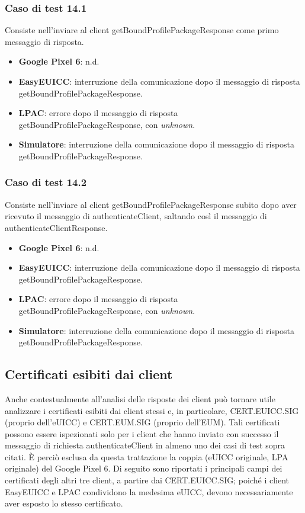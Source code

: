 \documentclass[10pt, oneside]{book}
\begin{document}
\subsubsection{Caso di test 14.1}
Consiste nell’inviare al client getBoundProfilePackageResponse come primo messaggio di risposta.
\begin{itemize}
\item \textbf{Google Pixel 6}: n.d.
\item \textbf{EasyEUICC}: interruzione della comunicazione dopo il messaggio di risposta getBoundProfilePackageResponse.
\item \textbf{LPAC}: errore dopo il messaggio di risposta getBoundProfilePackageResponse, con \textit{unknown}.
\item \textbf{Simulatore}: interruzione della comunicazione dopo il messaggio di risposta getBoundProfilePackageResponse.
\end{itemize}

\subsubsection{Caso di test 14.2}
Consiste nell’inviare al client getBoundProfilePackageResponse subito dopo aver ricevuto il messaggio di authenticateClient, saltando così il messaggio di authenticateClientResponse.
\begin{itemize}
\item \textbf{Google Pixel 6}: n.d.
\item \textbf{EasyEUICC}: interruzione della comunicazione dopo il messaggio di risposta getBoundProfilePackageResponse.
\item \textbf{LPAC}: errore dopo il messaggio di risposta getBoundProfilePackageResponse, con \textit{unknown}.
\item \textbf{Simulatore}: interruzione della comunicazione dopo il messaggio di risposta getBoundProfilePackageResponse.
\end{itemize}

\subsection{Certificati esibiti dai client}
Anche contestualmente all'analisi delle risposte dei client può tornare utile analizzare i certificati esibiti dai client stessi e, in particolare, CERT.EUICC.SIG (proprio dell'eUICC) e CERT.EUM.SIG (proprio dell'EUM). Tali certificati possono essere ispezionati solo per i client che hanno inviato con successo il messaggio di richiesta authenticateClient in almeno uno dei casi di test sopra citati. È perciò esclusa da questa trattazione la coppia (eUICC originale, LPA originale) del Google Pixel 6. Di seguito sono riportati i principali campi dei certificati degli altri tre client, a partire dai CERT.EUICC.SIG; poiché i client EasyEUICC e LPAC condividono la medesima eUICC, devono necessariamente aver esposto lo stesso certificato.
\end{document}
